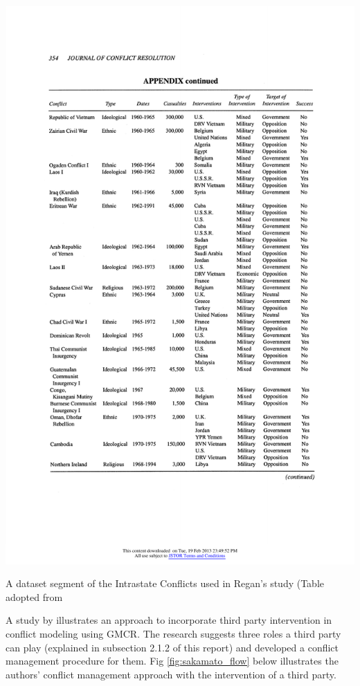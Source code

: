 \documentclass[letterpaper,12pt,titlepage,oneside,final]{book}
\begin{document}
\begin{center}

\begin{table}[H]
\centering
\includegraphics[scale=1]{PDF-IMG/Regan_set.pdf}

\caption{A dataset segment of the Intrastate Conflicts used in Regan's study (Table adopted from \citet{regan1996}}

\label{tbl:reganset}
\end{table}

\end{center}


A study by \citet{sakamoto2005} illustrates an approach to incorporate third party intervention in conflict modeling using GMCR. The research suggests three roles a third party can play (explained in subsection 2.1.2 of this report) and developed a conflict management procedure for them. Fig \ref{fig:sakamato_flow} below illustrates the authors' conflict management approach with the intervention of a third party.
\end{document}

